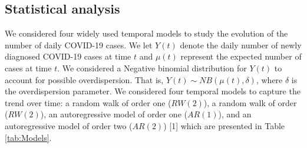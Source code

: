 \documentclass[10pt,letterpaper]{article}
\begin{document}
\hypertarget{statistical-analysis}{%
\subsection{Statistical analysis}\label{statistical-analysis}}

We considered four widely used temporal models to study the evolution of the number of daily COVID-19 cases. We let \(Y(t)\) denote the daily
number of newly diagnosed COVID-19 cases at time \(t\) and \(\mu(t)\)
represent the expected number of cases at time \(t\). We considered a
Negative binomial distribution for \(Y(t)\) to account for possible
overdispersion. That is, \(Y(t) \sim NB(\mu(t), \delta)\), where
\(\delta\) is the overdispersion parameter. We considered four temporal
models to capture the trend over time: a random walk of order one (\(RW(2)\)), a random walk of order (\(RW(2)\)), an autoregressive model of order one (\(AR(1)\)), and an autoregressive model of order two (\(AR(2)\))
{[}1{]} which are presented in Table \ref{tab:Models}. 

\end{document}
